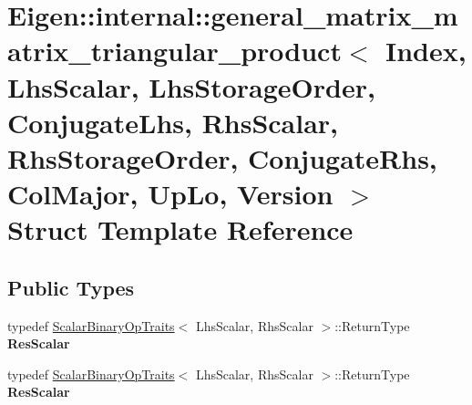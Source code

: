 \hypertarget{struct_eigen_1_1internal_1_1general__matrix__matrix__triangular__product_3_01_index_00_01_lhs_sc850fa7ad178159e52280c5aa1e0ab36e}{}\section{Eigen\+:\+:internal\+:\+:general\+\_\+matrix\+\_\+matrix\+\_\+triangular\+\_\+product$<$ Index, Lhs\+Scalar, Lhs\+Storage\+Order, Conjugate\+Lhs, Rhs\+Scalar, Rhs\+Storage\+Order, Conjugate\+Rhs, Col\+Major, Up\+Lo, Version $>$ Struct Template Reference}
\label{struct_eigen_1_1internal_1_1general__matrix__matrix__triangular__product_3_01_index_00_01_lhs_sc850fa7ad178159e52280c5aa1e0ab36e}
\subsection*{Public Types}
\begin{DoxyCompactItemize}
\item 
\mbox{\label{struct_eigen_1_1internal_1_1general__matrix__matrix__triangular__product_3_01_index_00_01_lhs_sc850fa7ad178159e52280c5aa1e0ab36e_a5837728f5a026cb28a4d543fd1b87772}} 
typedef \hyperlink{group___core___module_struct_eigen_1_1_scalar_binary_op_traits}{Scalar\+Binary\+Op\+Traits}$<$ Lhs\+Scalar, Rhs\+Scalar $>$\+::Return\+Type {\bfseries Res\+Scalar}
\item 
\mbox{\label{struct_eigen_1_1internal_1_1general__matrix__matrix__triangular__product_3_01_index_00_01_lhs_sc850fa7ad178159e52280c5aa1e0ab36e_a5837728f5a026cb28a4d543fd1b87772}} 
typedef \hyperlink{group___core___module_struct_eigen_1_1_scalar_binary_op_traits}{Scalar\+Binary\+Op\+Traits}$<$ Lhs\+Scalar, Rhs\+Scalar $>$\+::Return\+Type {\bfseries Res\+Scalar}
\end{DoxyCompactItemize}
